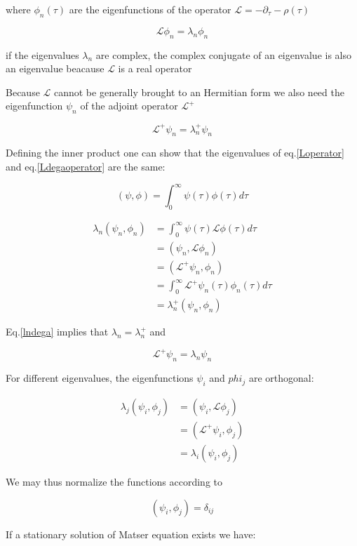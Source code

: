 \documentclass[a4paper,12pt,twoside]{article}
\def \be {\begin{equation}}
\def \ee {\end{equation}}
\begin{document}
where $\phi_n(\tau)$ are the eigenfunctions of the operator $\mathcal{L}=-\partial_{\tau}-\rho(\tau)$


\be
\label{Loperator}
\mathcal{L}\phi_n=\lambda_n\phi_n
\ee

if the eigenvalues $\lambda_n$ are complex, the complex conjugate of an eigenvalue is also an eigenvalue beacause $\mathcal{L}$ is a real operator

Because $\mathcal{L}$ cannot be generally brought to an Hermitian form we also need  the eigenfunction $\psi_n$ of the adjoint operator  $\mathcal{L}^{+}$

\be
\label{Ldegaoperator}
\mathcal{L}^+\psi_n=\lambda_n^+\psi_n
\ee

Defining the inner product one can show that the eigenvalues of eq.\eqref{Loperator} and eq.\eqref{Ldegaoperator} are the same:

\be
(\psi,\phi)=\int_{0}^{\infty}\psi(\tau)\phi(\tau)d\tau
\ee

\begin{align}
\lambda_n(\psi_n,\phi_n) &=\int_{0}^{\infty}\psi(\tau)\mathcal{L}\phi(\tau)d\tau  \nonumber \\
&=(\psi_n,\mathcal{L}\phi_n)  \nonumber \\
&=(\mathcal{L}^+\psi_n,\phi_n)  \nonumber \\
&=\int_{0}^{\infty}\mathcal{L}^+\psi_n(\tau)\phi_n(\tau)d\tau  \nonumber \\
&=\lambda_n^+(\psi_n,\phi_n) \label{lndega}
\end{align}

Eq.\eqref{lndega} implies that $\lambda_n=\lambda_n^+$ and
	
\be
\label{Ldegaoperator2}
\mathcal{L}^+\psi_n=\lambda_n\psi_n
\ee

For different eigenvalues, the eigenfunctions $\psi_i$ and $phi_j$ are orthogonal:

\begin{align}
\lambda_j(\psi_i,\phi_j) 
&=(\psi_i,\mathcal{L}\phi_j) \nonumber \\
&=(\mathcal{L}^+\psi_i,\phi_j)  \nonumber \\
&=\lambda_i(\psi_i,\phi_j) \label{lorthogonal}
\end{align}

We may thus normalize the functions according to 

\be
\label{dij}
(\psi_i,\phi_j)=\delta_{ij}
\ee

If a stationary solution of Matser equation exists we have:
\end{document}
